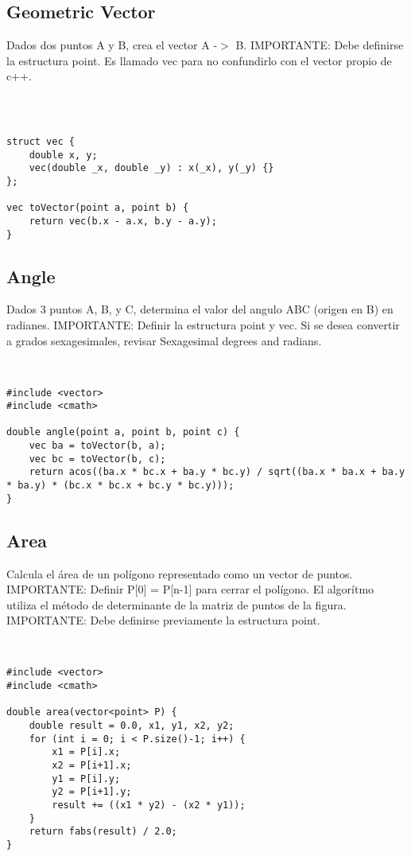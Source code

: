 \documentclass[11pt,letterpaper,twocolumn,twosided]{article}
\begin{document}
\subsection{Geometric Vector}
Dados dos puntos A y B, crea el vector A -$>$ B. IMPORTANTE: Debe definirse la estructura point. Es llamado vec para no confundirlo con el vector propio de c++.
\begin{lstlisting}



struct vec { 
	double x, y;  
  	vec(double _x, double _y) : x(_x), y(_y) {} 
};

vec toVector(point a, point b) {       
	return vec(b.x - a.x, b.y - a.y); 
}
\end{lstlisting}

\subsection{Angle}
Dados 3 puntos A, B, y C, determina el valor del angulo ABC (origen en B) en radianes. IMPORTANTE: Definir la estructura point y vec. Si se desea convertir a grados sexagesimales, revisar Sexagesimal degrees and radians.

\begin{lstlisting}


#include <vector>
#include <cmath>

double angle(point a, point b, point c) { 
  	vec ba = toVector(b, a);
  	vec bc = toVector(b, c);
  	return acos((ba.x * bc.x + ba.y * bc.y) / sqrt((ba.x * ba.x + ba.y * ba.y) * (bc.x * bc.x + bc.y * bc.y))); 
}
\end{lstlisting}

\subsection{Area}
Calcula el \'area de un pol\'igono representado como un vector de puntos. IMPORTANTE: Definir P[0] = P[n-1] para cerrar el pol\'igono. El algor\'itmo utiliza el m\'etodo de determinante de la matriz de puntos de la figura. IMPORTANTE: Debe definirse previamente la estructura point.

\begin{lstlisting}


#include <vector>
#include <cmath>

double area(vector<point> P) {
	double result = 0.0, x1, y1, x2, y2;
  	for (int i = 0; i < P.size()-1; i++) {
    	x1 = P[i].x; 
    	x2 = P[i+1].x;
    	y1 = P[i].y; 
    	y2 = P[i+1].y;
    	result += ((x1 * y2) - (x2 * y1));
  	}
  	return fabs(result) / 2.0; 
}
\end{lstlisting}
\end{document}
